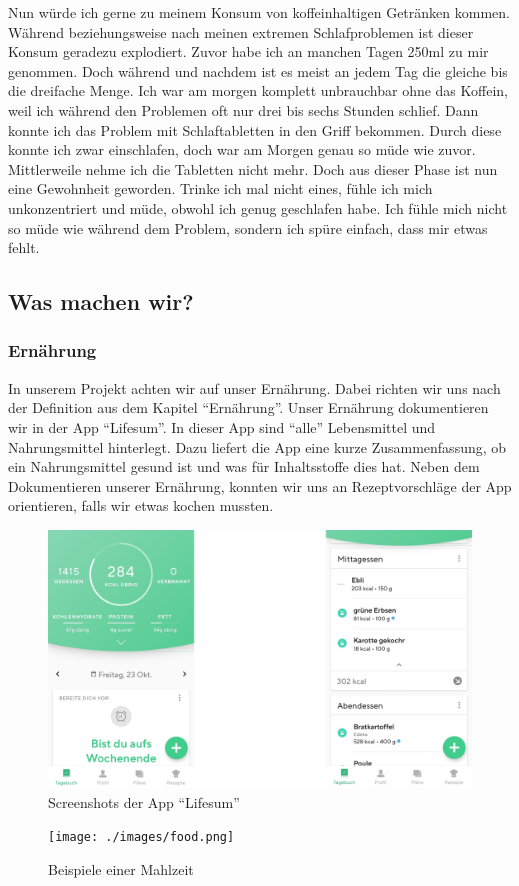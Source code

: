Nun würde ich gerne zu meinem Konsum von koffeinhaltigen Getränken kommen. Während beziehungsweise nach meinen extremen Schlafproblemen ist dieser Konsum geradezu explodiert. Zuvor habe ich an manchen Tagen 250ml zu mir genommen. Doch während und nachdem ist es meist an jedem Tag die gleiche bis die dreifache Menge. Ich war am morgen komplett unbrauchbar ohne das Koffein, weil ich während den Problemen oft nur drei bis sechs Stunden schlief. Dann konnte ich das Problem mit Schlaftabletten in den Griff bekommen. Durch diese konnte ich zwar einschlafen, doch war am Morgen genau so müde wie zuvor. Mittlerweile nehme ich die Tabletten nicht mehr. Doch aus dieser Phase ist nun eine Gewohnheit geworden. Trinke ich mal nicht eines, fühle ich mich unkonzentriert und müde, obwohl ich genug geschlafen habe. Ich fühle mich nicht so müde wie während dem Problem, sondern ich spüre einfach, dass mir etwas fehlt.
\pagebreak
\subsection{Was machen wir?}
\subsubsection{Ernährung}
In unserem Projekt achten wir auf unser Ernährung. Dabei richten wir uns nach der Definition aus dem Kapitel “Ernährung”.
\newline
Unser Ernährung dokumentieren wir in der App “Lifesum”. In dieser App sind “alle” Lebensmittel und Nahrungsmittel hinterlegt. Dazu liefert die App eine kurze Zusammenfassung, ob ein Nahrungsmittel gesund ist und was für Inhaltsstoffe dies hat. Neben dem Dokumentieren unserer Ernährung, konnten wir uns an Rezeptvorschläge der App orientieren, falls wir etwas kochen mussten.
\newline
\begin{figure}[!ht]
  \centering
  \includegraphics[width=0.7\linewidth]{./images/app.png}
  \caption{Screenshots der App “Lifesum”}
  \label{fig:app_1}
\end{figure}
\newline
\begin{figure}[!ht]
  \centering
  \texttt{[image: ./images/food.png]}
  \caption{Beispiele einer Mahlzeit}
  \label{fig:app_1}
\end{figure}
\newline
